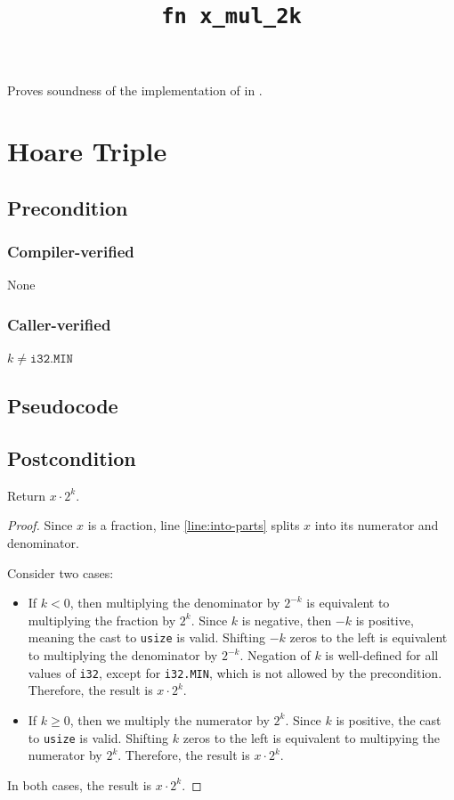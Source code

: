 \documentclass{article}
\title{\texttt{fn x\_mul\_2k}}
\author{\MichaelShoemateAuthor}
\date{}
\begin{document}
\maketitle
\contrib
Proves soundness of the implementation of  in .

\section{Hoare Triple}
\subsection*{Precondition}
\subsubsection*{Compiler-verified}
None

\subsubsection*{Caller-verified}
$k \neq \texttt{i32.MIN}$


\subsection*{Pseudocode}


\subsection*{Postcondition}
\begin{theorem}
    Return $x \cdot 2^k$.
\end{theorem}

\begin{proof}
    Since $x$ is a fraction, line \ref{line:into-parts} splits $x$ into its numerator and denominator.

    Consider two cases:
    \begin{itemize}
        \item If $k < 0$, then multiplying the denominator by $2^{-k}$ is equivalent to multiplying the fraction by $2^k$.
            Since $k$ is negative, then $-k$ is positive, meaning the cast to \texttt{usize} is valid.
            Shifting $-k$ zeros to the left is equivalent to multiplying the denominator by $2^{-k}$.
            Negation of $k$ is well-defined for all values of \texttt{i32},
            except for \texttt{i32.MIN}, which is not allowed by the precondition.
            Therefore, the result is $x \cdot 2^k$.

        \item If $k \geq 0$, then we multiply the numerator by $2^k$.
            Since $k$ is positive, the cast to \texttt{usize} is valid.
            Shifting $k$ zeros to the left is equivalent to multipying the numerator by $2^k$.
            Therefore, the result is $x \cdot 2^k$.
    \end{itemize}

    In both cases, the result is $x \cdot 2^k$.
\end{proof}
\end{document}
